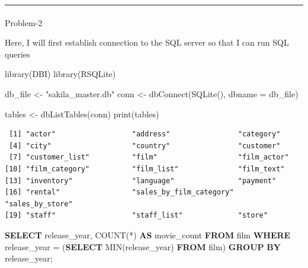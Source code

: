 \documentclass[
  12pt,
]{article}
\makeatletter
\let\oldparagraph\paragraph
\renewcommand{\paragraph}{
    \@ifstar
      \xxxParagraphStar
      \xxxParagraphNoStar
  }
\newcommand{\xxxParagraphStar}[1]{\oldparagraph*{#1}\mbox{}}
\newcommand{\xxxParagraphNoStar}[1]{\oldparagraph{#1}\mbox{}}
\newenvironment{Shaded}{\begin{snugshade}}{\end{snugshade}}
\newcommand{\AttributeTok}[1]{\textcolor[rgb]{0.40,0.45,0.13}{#1}}
\newcommand{\FunctionTok}[1]{\textcolor[rgb]{0.28,0.35,0.67}{#1}}
\newcommand{\KeywordTok}[1]{\textcolor[rgb]{0.00,0.23,0.31}{\textbf{#1}}}
\newcommand{\NormalTok}[1]{\textcolor[rgb]{0.00,0.23,0.31}{#1}}
\newcommand{\OperatorTok}[1]{\textcolor[rgb]{0.37,0.37,0.37}{#1}}
\newcommand{\OtherTok}[1]{\textcolor[rgb]{0.00,0.23,0.31}{#1}}
\newcommand{\StringTok}[1]{\textcolor[rgb]{0.13,0.47,0.30}{#1}}
\makeatother
\begin{document}
\begin{center}\rule{0.5\linewidth}{0.5pt}\end{center}

\paragraph{Problem-2}\label{problem-2}

Here, I will first establish connection to the SQL server so that I can
run SQL queries

\begin{Shaded}
\begin{Highlighting}[]
\FunctionTok{library}\NormalTok{(DBI)}
\FunctionTok{library}\NormalTok{(RSQLite)}

\NormalTok{db\_file }\OtherTok{\textless{}{-}} \StringTok{"sakila\_master.db"}
\NormalTok{conn }\OtherTok{\textless{}{-}} \FunctionTok{dbConnect}\NormalTok{(}\FunctionTok{SQLite}\NormalTok{(), }\AttributeTok{dbname =}\NormalTok{ db\_file)}
\end{Highlighting}
\end{Shaded}

\begin{Shaded}
\begin{Highlighting}[]
\NormalTok{tables }\OtherTok{\textless{}{-}} \FunctionTok{dbListTables}\NormalTok{(conn)}
\FunctionTok{print}\NormalTok{(tables)}
\end{Highlighting}
\end{Shaded}

\begin{verbatim}
 [1] "actor"                  "address"                "category"              
 [4] "city"                   "country"                "customer"              
 [7] "customer_list"          "film"                   "film_actor"            
[10] "film_category"          "film_list"              "film_text"             
[13] "inventory"              "language"               "payment"               
[16] "rental"                 "sales_by_film_category" "sales_by_store"        
[19] "staff"                  "staff_list"             "store"                 
\end{verbatim}

\begin{Shaded}
\begin{Highlighting}[]
\KeywordTok{SELECT}\NormalTok{ release\_year, }\FunctionTok{COUNT}\NormalTok{(}\OperatorTok{*}\NormalTok{) }\KeywordTok{AS}\NormalTok{ movie\_count}
\KeywordTok{FROM}\NormalTok{ film}
\KeywordTok{WHERE}\NormalTok{ release\_year }\OperatorTok{=}\NormalTok{ (}\KeywordTok{SELECT} \FunctionTok{MIN}\NormalTok{(release\_year) }\KeywordTok{FROM}\NormalTok{ film)}
\KeywordTok{GROUP} \KeywordTok{BY}\NormalTok{ release\_year;}
\end{Highlighting}
\end{Shaded}
\end{document}
